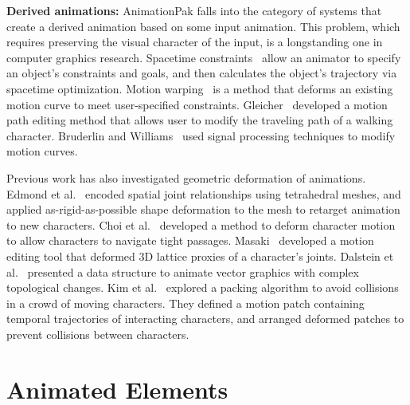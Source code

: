 \textbf{Derived animations:} 
AnimationPak falls into the category of systems that create a derived
animation based on some input animation. This problem, which
requires preserving the visual character of the input, is a 
longstanding one in computer graphics research.
Spacetime constraints~\cite{Witkin1988, Cohen1992} allow an animator
to specify an object's constraints and goals, and then calculates 
the object's trajectory via spacetime optimization.
Motion warping~\cite{Witkin1995} is a method that deforms an existing
motion curve to meet user-specified constraints.
Gleicher~\cite{Gleicher2001} developed a motion path editing method
that allows user to modify the traveling path of a walking character.
Bruderlin and Williams~\cite{Bruderlin1995} used signal processing techniques
to modify motion curves.


Previous work has also investigated geometric deformation of 
animations.
Edmond et al.~\cite{Ho2010} encoded spatial joint relationships 
using tetrahedral meshes, and applied as-rigid-as-possible shape deformation
to the mesh to retarget animation to new characters.
Choi et al.~\cite{Choi2011} developed a method to deform character motion
to allow characters to navigate tight passages.
Masaki~\cite{Oshita2017} developed a motion editing tool that deformed
3D lattice proxies of  a character's joints.
Dalstein et al.~\cite{Dalstein2015} presented a data structure
to animate vector graphics with complex topological changes.
Kim et al.~\cite{Kim2012} explored a packing algorithm
to avoid collisions in a crowd of moving characters.
They defined a motion patch containing temporal trajectories of interacting
characters, and arranged deformed patches to prevent collisions between
characters.


\section{Animated Elements}
\label{animationpak_animated_element}


